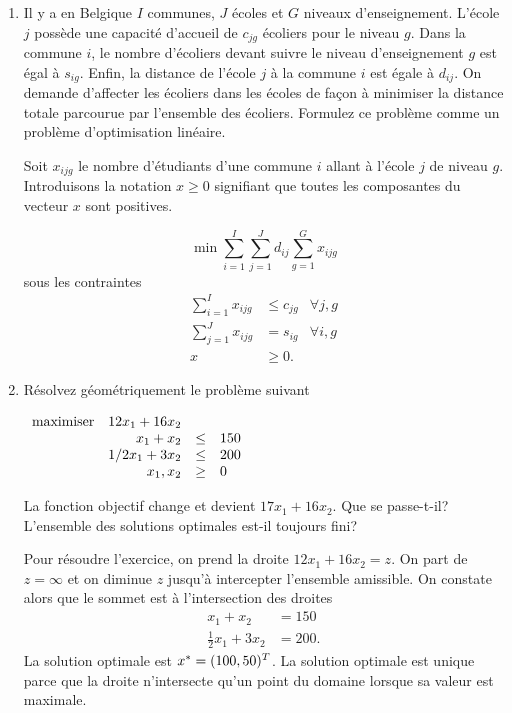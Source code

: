 \begin{enumerate}
  \item Il y a en Belgique $I$ communes, $J$ écoles et $G$ niveaux
    d'enseignement. L'école $j$ possède  une capacité d'accueil de $c_{jg}$
    écoliers pour le niveau $g$. Dans la commune $i$, le nombre d'écoliers devant
    suivre le niveau d'enseignement $g$ est égal à $s_{ig}$. Enfin, la distance de
    l'école $j$ à la commune $i$ est égale à $d_{ij}$. On demande d'affecter les écoliers dans les écoles de façon à minimiser la
    distance totale parcourue par l'ensemble des écoliers. Formulez ce problème comme un problème d'optimisation linéaire.


    \begin{solution}
      Soit $x_{ijg}$ le nombre d'étudiants d'une commune $i$ allant à l'école $j$ de niveau $g$.
      Introduisons la notation $x \geq 0$ signifiant que toutes les composantes du vecteur $x$ sont positives.

      \[ \min \sum_{i=1}^I \sum_{j=1}^J d_{ij} \sum_{g=1}^G x_{ijg} \]
      sous les contraintes
      \begin{align*}
        \sum_{i=1}^I x_{ijg} & \leq c_{jg} & \forall j, g\\
        \sum_{j=1}^J x_{ijg} & = s_{ig} & \forall i, g\\
        x & \geq 0.
      \end{align*}
    \end{solution}


  \item Résolvez géométriquement le problème suivant

    $
    \begin{array}{lrcl}
      \mbox{maximiser} & 12 x_1+16 x_2\\
      & x_1 + x_2 & \leq & 150\\
      & 1/2 x_1 + 3x_2 & \leq & 200\\
      & x_1, x_2 & \geq & 0
    \end{array}
    $

    La fonction objectif change et devient $17 x_1+16 x_2$. Que se passe-t-il? L'ensemble des solutions optimales est-il toujours fini?
    \begin{solution}
      Pour résoudre l'exercice, on prend la droite $12x_1 + 16x_2 = z$.
      On part de $z = \infty$ et on diminue $z$ jusqu'à intercepter l'ensemble
      amissible.
      On constate alors que le sommet est à l'intersection des droites
      \begin{align*}
        x_{1} + x_{2} & = 150\\
        \frac{1}{2}x_{1} + 3x_{2} & = 200.
      \end{align*}
      La solution optimale est $x^* = (100,50)^{T}$.
      La solution optimale est unique parce que la droite n'intersecte
      qu'un point du domaine lorsque sa valeur est maximale.


\end{solution}
\end{enumerate}

